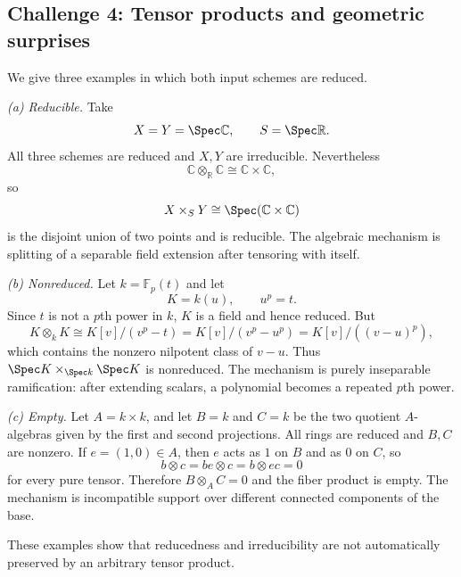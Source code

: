 \subsection*{Challenge 4: Tensor products and geometric surprises}
\begin{solution}
We give three examples in which both input schemes are reduced.

\emph{(a) Reducible.}
Take
\[
X=Y=\Spec\mathbb C,\qquad S=\Spec\mathbb R.
\]
All three schemes are reduced and $X,Y$ are irreducible.  Nevertheless
\[
\mathbb C\otimes_{\mathbb R}\mathbb C\cong\mathbb C\times\mathbb C,
\]
so
\[
X\times_SY\cong\Spec(\mathbb C\times\mathbb C)
\]
is the disjoint union of two points and is reducible.  The algebraic mechanism is splitting of a
separable field extension after tensoring with itself.

\emph{(b) Nonreduced.}
Let $k=\mathbb F_p(t)$ and let
\[
K=k(u),\qquad u^p=t.
\]
Since $t$ is not a $p$th power in $k$, $K$ is a field and hence reduced.  But
\[
K\otimes_kK
\cong
K[v]/(v^p-t)
=
K[v]/(v^p-u^p)
=
K[v]/((v-u)^p),
\]
which contains the nonzero nilpotent class of $v-u$.  Thus
$\Spec K\times_{\Spec k}\Spec K$ is nonreduced.  The mechanism is purely inseparable
ramification: after extending scalars, a polynomial becomes a repeated $p$th power.

\emph{(c) Empty.}
Let $A=k\times k$, and let $B=k$ and $C=k$ be the two quotient $A$-algebras given by the first
and second projections.  All rings are reduced and $B,C$ are nonzero.  If $e=(1,0)\in A$, then
$e$ acts as $1$ on $B$ and as $0$ on $C$, so
\[
b\otimes c=be\otimes c=b\otimes ec=0
\]
for every pure tensor.  Therefore $B\otimes_AC=0$ and the fiber product is empty.  The mechanism
is incompatible support over different connected components of the base.

These examples show that reducedness and irreducibility are not automatically preserved by an
arbitrary tensor product.
\end{solution}

